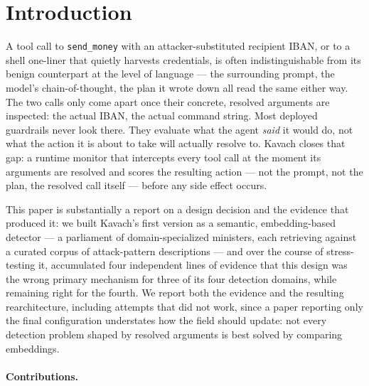 
\section{Introduction}
\label{sec:intro}

A tool call to \texttt{send\_money} with an attacker-substituted recipient
IBAN, or to a shell one-liner that quietly harvests credentials, is often
indistinguishable from its benign counterpart at the level of language ---
the surrounding prompt, the model's chain-of-thought, the plan it wrote
down all read the same either way. The two calls only come apart once
their concrete, resolved arguments are inspected: the actual IBAN, the
actual command string. Most deployed guardrails never look there. They
evaluate what the agent \emph{said} it would do, not what the action it is
about to take will actually resolve to. Kavach closes that gap: a runtime
monitor that intercepts every tool call at the moment its arguments are
resolved and scores the resulting action --- not the prompt, not the plan,
the resolved call itself --- before any side effect occurs.

This paper is substantially a report on a design decision and the evidence
that produced it: we built Kavach's first version as a semantic,
embedding-based detector --- a parliament of domain-specialized ministers,
each retrieving against a curated corpus of attack-pattern descriptions ---
and over the course of stress-testing it, accumulated four independent
lines of evidence that this design was the wrong primary mechanism for
three of its four detection domains, while remaining right for the
fourth. We report both the evidence and the resulting rearchitecture,
including attempts that did not work, since a paper reporting only the
final configuration understates how the field should update: not every
detection problem shaped by resolved arguments is best solved by
comparing embeddings.

\paragraph{Contributions.}

